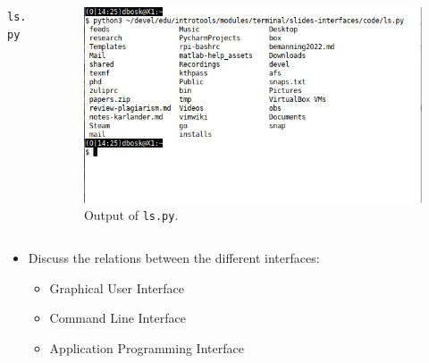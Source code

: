 \begin{frame}
  \begin{columns}
    \begin{column}{0.7\columnwidth}
      \begin{block}{\texttt{ls.py}}
        \inputminted[fontsize=\tiny,linenos,highlightlines={1-2,5,7}]{python}{code/ls.py}
      \end{block}
    \end{column}
    \begin{column}{0.3\columnwidth}
      \begin{figure}
        \includegraphics[width=\columnwidth]{fig/ls-out.png}
        \caption{Output of \texttt{ls.py}.}
      \end{figure}
    \end{column}
  \end{columns}
\end{frame}

\begin{frame}
  \begin{exercise}
    \begin{itemize}
      \item Discuss the relations between the different interfaces:
        \begin{itemize}
          \item Graphical User Interface
          \item Command Line Interface
          \item Application Programming Interface
        \end{itemize}
    \end{itemize}
  \end{exercise}
\end{frame}

